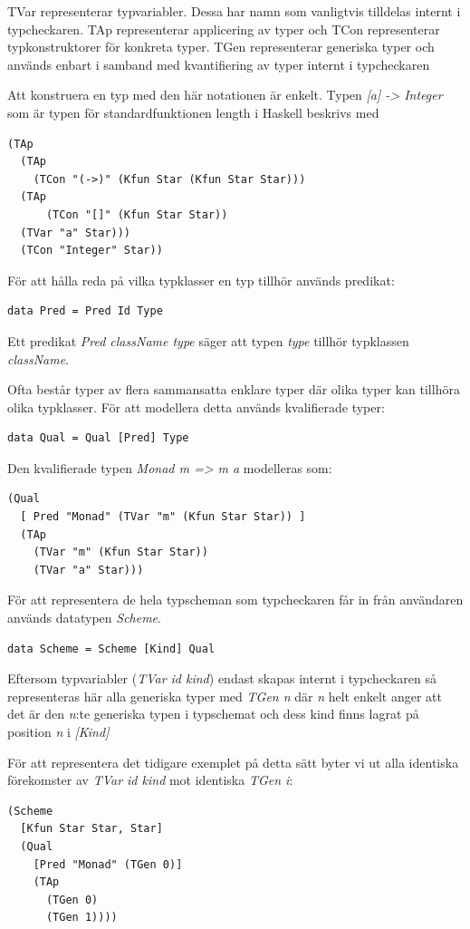 TVar representerar typvariabler. Dessa har namn som vanligtvis tilldelas internt i typcheckaren. TAp representerar applicering av typer och TCon representerar typkonstruktorer för konkreta typer. TGen representerar
generiska typer och används enbart i samband med kvantifiering av
typer internt i typcheckaren

Att konstruera en typ med den här notationen är enkelt. Typen \emph{[a] ->
Integer} som är typen för standardfunktionen length i Haskell beskrivs med
\begin{lstlisting}
(TAp
  (TAp
    (TCon "(->)" (Kfun Star (Kfun Star Star)))
  (TAp
      (TCon "[]" (Kfun Star Star))
  (TVar "a" Star)))
  (TCon "Integer" Star))
\end{lstlisting}

För att hålla reda på vilka typklasser en typ tillhör används predikat:
\begin{lstlisting}
data Pred = Pred Id Type
\end{lstlisting}
Ett predikat \emph{Pred className type} säger att typen \emph{type} tillhör typklassen \emph{className}.

Ofta består typer av flera sammansatta enklare typer där olika typer kan tillhöra olika typklasser. För att modellera detta används kvalifierade typer:
\begin{lstlisting}
data Qual = Qual [Pred] Type
\end{lstlisting}

Den kvalifierade typen \emph{Monad m => m a} modelleras som:
\begin{lstlisting}
(Qual
  [ Pred "Monad" (TVar "m" (Kfun Star Star)) ]
  (TAp
    (TVar "m" (Kfun Star Star))
    (TVar "a" Star)))
\end{lstlisting}

För att representera de hela typscheman som typcheckaren får in från användaren används datatypen \emph{Scheme}.
\begin{lstlisting}
data Scheme = Scheme [Kind] Qual
\end{lstlisting}
Eftersom typvariabler (\emph{TVar id kind}) endast skapas internt i typcheckaren så representeras här alla generiska typer med \emph{TGen n} där \emph{n} helt enkelt anger att det är den \emph{n}:te generiska typen i typschemat och dess kind finns lagrat på position \emph{n} i \emph{[Kind]}

För att representera det tidigare exemplet på detta sätt byter vi ut alla identiska förekomster av \emph{TVar id kind} mot identiska \emph{TGen i}:
\begin{lstlisting}
(Scheme
  [Kfun Star Star, Star]
  (Qual
    [Pred "Monad" (TGen 0)]
    (TAp
      (TGen 0)
      (TGen 1))))
\end{lstlisting}

